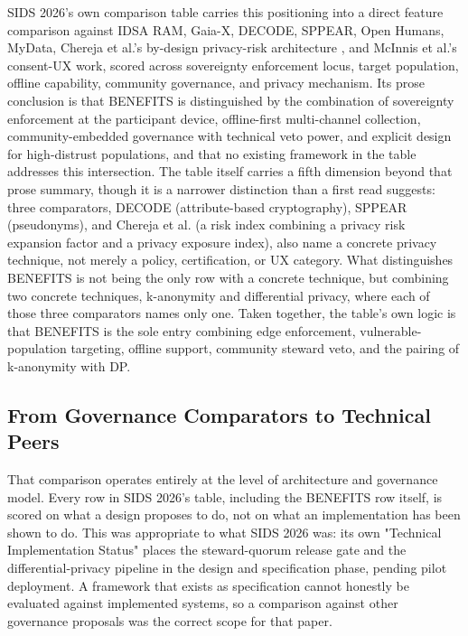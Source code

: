 SIDS 2026's own comparison table \cite{katrakazas2026} carries this positioning into a direct feature comparison against IDSA RAM, Gaia-X, DECODE, SPPEAR, Open Humans, MyData, Chereja et al.'s by-design privacy-risk architecture \cite{chereja2025}, and McInnis et al.'s consent-UX work, scored across sovereignty enforcement locus, target population, offline capability, community governance, and privacy mechanism. Its prose conclusion is that BENEFITS is distinguished by the combination of sovereignty enforcement at the participant device, offline-first multi-channel collection, community-embedded governance with technical veto power, and explicit design for high-distrust populations, and that no existing framework in the table addresses this intersection. The table itself carries a fifth dimension beyond that prose summary, though it is a narrower distinction than a first read suggests: three comparators, DECODE (attribute-based cryptography), SPPEAR (pseudonyms), and Chereja et al. (a risk index combining a privacy risk expansion factor and a privacy exposure index), also name a concrete privacy technique, not merely a policy, certification, or UX category. What distinguishes BENEFITS is not being the only row with a concrete technique, but combining two concrete techniques, k-anonymity and differential privacy, where each of those three comparators names only one. Taken together, the table's own logic is that BENEFITS is the sole entry combining edge enforcement, vulnerable-population targeting, offline support, community steward veto, and the pairing of k-anonymity with DP.

\subsection{From Governance Comparators to Technical Peers}

That comparison operates entirely at the level of architecture and governance model. Every row in SIDS 2026's table, including the BENEFITS row itself, is scored on what a design proposes to do, not on what an implementation has been shown to do. This was appropriate to what SIDS 2026 was: its own "Technical Implementation Status" places the steward-quorum release gate and the differential-privacy pipeline in the design and specification phase, pending pilot deployment. A framework that exists as specification cannot honestly be evaluated against implemented systems, so a comparison against other governance proposals was the correct scope for that paper.

